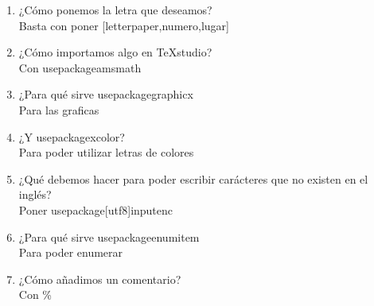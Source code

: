 \documentclass[letterpaper, 12pt, oneside]{article}%
\begin{document}
\begin{enumerate}
\item ¿Cómo ponemos la letra que deseamos?\\
Basta con poner [letterpaper,numero,lugar]
\item ¿Cómo importamos algo en TeXstudio?\\
Con usepackage{amsmath} 
\item ¿Para qué sirve usepackage{graphicx}\\
Para las graficas 
\item ¿Y usepackage{xcolor}?\\
Para poder utilizar letras de colores
\item ¿Qué debemos hacer para poder escribir carácteres que no existen en el inglés?\\
Poner usepackage[utf8]{inputenc}
\item ¿Para qué sirve usepackage{enumitem}\\ 
Para poder enumerar 
\item ¿Cómo añadimos un comentario?\\
Con \%
\end{enumerate}
\end{document}
